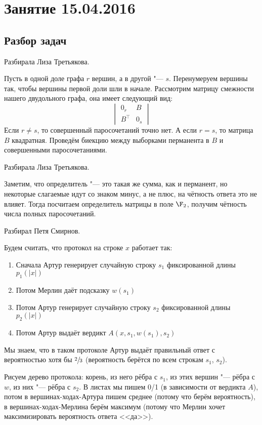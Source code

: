 \chapter{Занятие 15.04.2016}

\section{Разбор задач}
	Разбирала Лиза Третьякова.

	Пусть в одной доле графа $r$ вершин, а в другой "--- $s$.
	Перенумеруем вершины так, чтобы вершины первой доли шли в начале.
	Рассмотрим матрицу смежности нашего двудольного графа, она имеет следующий вид:
	\[
		\begin{vmatrix}
			0_r & B \\
			B^{\top} & 0_s
		\end{vmatrix}
	\]
	Если $r\neq s$, то совершенный паросочетаний точно нет.
	А если $r=s$, то матрица $B$ квадратная.
	Проведём биекцию между выборками перманента в $B$ и совершенными паросочетаниями.
	\TODO

	Разбирала Лиза Третьякова.

	Заметим, что определитель "--- это такая же сумма, как и перманент, но некоторые слагаемые
	идут со знаком минус, а не плюс, на чётность ответа это не влияет.
	Тогда посчитаем определитель матрицы в поле $\F_2$, получим чётность числа полных паросочетаний.

	Разбирал Петя Смирнов.

	Будем считать, что протокол  на строке $x$ работает так:
	\begin{enumerate}
		\item
			Сначала Артур генерирует случайную строку $s_1$ фиксированной длины $p_1(|x|)$
		\item
			Потом Мерлин даёт подсказку $w(s_1)$
		\item
			Потом Артур генерирует случайную строку $s_2$ фиксированной длины $p_2(|x|)$
		\item
			Потом Артур выдаёт вердикт $A(x, s_1, w(s_1), s_2)$
	\end{enumerate}
	Мы знаем, что в таком протоколе Артур выдаёт правильный ответ с вероятностью хотя бы $\sfrac 23$
	(вероятность берётся по всем строкам $s_1$, $s_2$).

	Рисуем дерево протокола: корень, из него рёбра с $s_1$, из этих вершин "--- рёбра с $w$,
	из них "--- рёбра с $s_2$.
	В листах мы пишем 0/1 (в зависимости от вердикта $A$), потом в вершинах-ходах-Артура пишем
	среднее (потому что берём вероятность), в вершинах-ходах-Мерлина берём максимум (потому что
	Мерлин хочет максимизировать вероятность ответа <<да>>).

